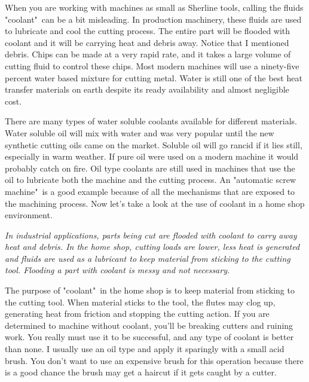 \secdown


When you are working with machines as small as Sherline tools, calling the
fluids "coolant"\ can be a bit misleading. In production machinery, these fluids
are used to lubricate and cool the cutting process. The entire part will be
flooded with coolant and it will be carrying heat and debris away. Notice that I
mentioned debris. Chips can be made at a very rapid rate, and it takes a large
volume of cutting fluid to control these chips. Most modern machines will use a
ninety-five percent water based mixture for cutting metal. Water is still one of
the best heat transfer materials on earth despite its ready availability and
almost negligible cost.


There are many types of water soluble coolants available for different
materials. Water soluble oil will mix with water and was very popular until the
new synthetic cutting oils came on the market. Soluble oil will go rancid if it
lies still, especially in warm weather. If pure oil were used on a modern
machine it would probably catch on fire. Oil type coolants are still used in
machines that use the oil to lubricate both the machine and the cutting process.
An "automatic screw machine"\ is a good example because of all the mechanisms
that are exposed to the machining process. Now let's take a look at the use of
coolant in a home shop environment.

\bigskip
\textit{In industrial applications, parts being cut are flooded with coolant to
carry away heat and debris. In the home shop, cutting loads are lower, less heat
is generated and fluids are used as a lubricant to keep material from sticking
to the cutting tool. Flooding a part with coolant is messy and not necessary.}
\bigskip


The purpose of "coolant"\ in the home shop is to keep material from sticking to
the cutting tool. When material sticks to the tool, the flutes may clog up,
generating heat from friction and stopping the cutting action. If you are
determined to machine without coolant, you'll be breaking cutters and ruining
work. You really must use it to be successful, and any type of coolant is better
than none. I usually use an oil type and apply it sparingly with a small acid
brush. You don't want to use an expensive brush for this operation because there
is a good chance the brush may get a haircut if it gets caught by a cutter.

